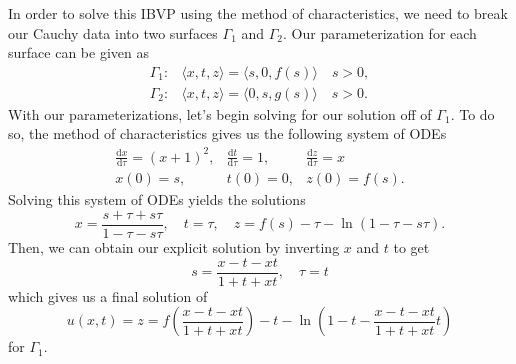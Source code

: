 \documentclass[a4paper,12pt]{article}
\newcommand{\dd}{\mathrm{d}}
\begin{document}
\begin{enumerate}[label = \arabic*.]
\begin{enumerate}[label = (\alph*)]
				In order to solve this IBVP using the method of characteristics, we need to break our Cauchy data into two surfaces $ \Gamma_1 $ and $ \Gamma_2 $. Our parameterization for each surface can be given as
				\begin{align*}
					\Gamma_1: & \langle x, t, z \rangle = \langle s, 0, f(s) \rangle  \quad s > 0, \\
					\Gamma_2: & \langle x, t, z \rangle = \langle 0, s, g(s) \rangle \quad s > 0.
				\end{align*}
				With our parameterizations, let's begin solving for our solution off of $ \Gamma_1 $. To do so, the method of characteristics gives us the following system of ODEs
				\[
					\begin{array}{ccc}
						\frac{\dd x}{\dd \tau} = (x + 1)^2, & \frac{\dd t}{\dd \tau} = 1, & \frac{\dd z}{\dd \tau} = x \\
						x(0) = s, & t(0) = 0, & z(0) = f(s).
					\end{array}
				\]
				Solving this system of ODEs yields the solutions
				\[
					x = \frac{s + \tau + s \tau}{1 - \tau - s \tau}, \quad t = \tau, \quad z = f(s) - \tau - \ln(1 - \tau - s \tau).
				\]
				Then, we can obtain our explicit solution by inverting $ x $ and $ t $ to get 
				\[
					s = \frac{x - t - x t}{1 + t + x t}, \quad \tau = t
				\]
				which gives us a final solution of
				\[
					u(x,t) = z = f\left(\frac{x - t - x t}{1 + t + x t}\right) - t - \ln\left(1 - t - \frac{x - t - x t}{1 + t + x t} t \right)
				\]
				for $ \Gamma_1 $.
				

\end{enumerate}
\end{enumerate}
\end{document}
